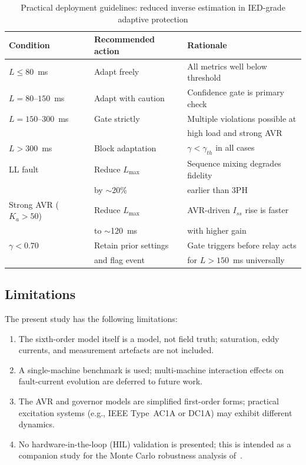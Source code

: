 \documentclass[journal,twoside,letterpaper]{IEEEtran}
\begin{document}
\begin{table}[!t]
\caption{Practical deployment guidelines: reduced inverse
         estimation in IED-grade adaptive protection}
\label{tab:guidelines}
\centering
\renewcommand{\arraystretch}{1.30}
\begin{tabular}{lll}
\toprule
Condition & Recommended action & Rationale \\
\midrule
$L \leq 80$~ms       & Adapt freely        & All metrics well below threshold \\
$L = 80$--$150$~ms   & Adapt with caution  & Confidence gate is primary check \\
$L = 150$--$300$~ms  & Gate strictly       & Multiple violations possible at \\
                     &                     & high load and strong AVR \\
$L > 300$~ms         & Block adaptation    & $\gamma < \gamma_{th}$ in all cases \\
LL fault             & Reduce $L_{\max}$   & Sequence mixing degrades fidelity \\
                     & by $\sim$20\%       & earlier than 3PH \\
Strong AVR ($K_a>50$)& Reduce $L_{\max}$   & AVR-driven $I_{ss}$ rise is faster \\
                     & to $\sim$120~ms     & with higher gain \\
$\gamma < 0.70$      & Retain prior settings & Gate triggers before relay acts \\
                     & and flag event      & for $L > 150$~ms universally \\
\bottomrule
\end{tabular}
\end{table}

\subsection{Limitations}

The present study has the following limitations:
\begin{enumerate}
  \item The sixth-order model itself is a model, not field
    truth; saturation, eddy currents, and measurement
    artefacts are not included.
  \item A single-machine benchmark is used;
    multi-machine interaction effects on fault-current
    evolution are deferred to future work.
  \item The AVR and governor models are simplified
    first-order forms; practical excitation systems
    (e.g., IEEE Type~AC1A or DC1A) may exhibit
    different dynamics.
  \item No hardware-in-the-loop (HIL) validation is
    presented; this is intended as a companion study
    for the Monte Carlo robustness analysis
    of~\cite{Eluvathingal2026_TR08}.
\end{enumerate}
\end{document}

